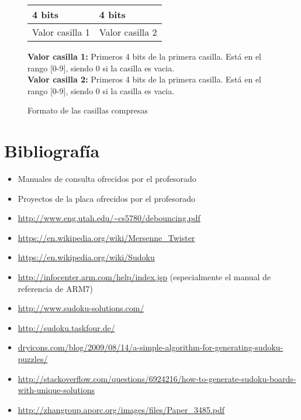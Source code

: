 \documentclass[12pt,letterpaper]{article}
\begin{document}
\begin{figure}
  \begin{center}
    \begin{tabular}{ | p{4cm} | p{4cm} | } \hline
      4 bits           & 4 bits          \\\hline
      Valor casilla 1  & Valor casilla 2 \\\hline
    \end{tabular}
  \end{center}
  \textbf{Valor casilla 1:} Primeros 4 bits de la primera
  casilla. Está en el rango [0-9], siendo 0 si la casilla es
  vacia. \\ 
  \textbf{Valor casilla 2:} Primeros 4 bits de la primera
  casilla. Está en el rango [0-9], siendo 0 si la casilla es vacia.
  \caption{Formato de las casillas compresas}
  \label{fig:formato-casilla-compreso}
\end{figure}

\clearpage
\section{Bibliografía}
\begin{itemize}
  \item Manuales de consulta ofrecidos por el profesorado
  \item Proyectos de la placa ofrecidos por el profesorado
  \item \url{http://www.eng.utah.edu/~cs5780/debouncing.pdf}
  \item \url{https://en.wikipedia.org/wiki/Mersenne_Twister}
  \item \url{https://en.wikipedia.org/wiki/Sudoku}
  \item \url{http://infocenter.arm.com/help/index.jsp} (especialmente
    el manual de referencia de ARM7)
  \item \url{http://www.sudoku-solutions.com/}
  \item \url{http://sudoku.taskfour.de/}
  \item
    \url{dryicons.com/blog/2009/08/14/a-simple-algorithm-for-generating-sudoku-puzzles/}
  \item
    \url{http://stackoverflow.com/questions/6924216/how-to-generate-sudoku-boards-with-unique-solutions}
  \item \url{http://zhangroup.aporc.org/images/files/Paper_3485.pdf}
\end{itemize}
\end{document}
